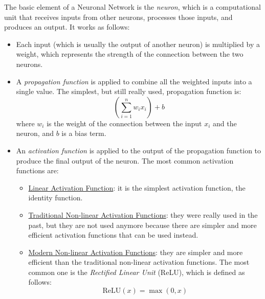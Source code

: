The basic element of a Neuronal Network is the \emph{neuron}, which is a computational unit that receives inputs from other neurons, processes those inputs, and produces an output. It works as follows:
\begin{itemize}
    \item Each input (which is usually the output of another neuron) is multiplied by a weight, which represents the strength of the connection between the two neurons.
    \item A \emph{propagation function} is applied to combine all the weighted inputs into a single value. The simplest, but still really used, propagation function is:
    \begin{equation*}
        \left(\sum_{i=1}^{n} w_i x_i\right) + b
    \end{equation*}
    where $w_i$ is the weight of the connection between the input $x_i$ and the neuron, and $b$ is a bias term.
    \item An \emph{activation function} is applied to the output of the propagation function to produce the final output of the neuron. The most common activation functions are:
    \begin{itemize}
        \item \ul{Linear Activation Function}: it is the simplest activation function, the identity function.
        \item \ul{Traditional Non-linear Activation Functions}: they were really used in the past, but they are not used anymore because there are simpler and more efficient activation functions that can be used instead.
        \item \ul{Modern Non-linear Activation Functions}: they are simpler and more efficient than the traditional non-linear activation functions. The most common one is the \emph{Rectified Linear Unit} (ReLU), which is defined as follows:
        \begin{equation*}
            \text{ReLU}(x) = \max(0, x)
        \end{equation*}
    \end{itemize}
\end{itemize}

